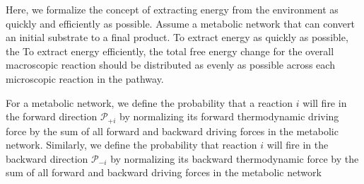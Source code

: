 Here, we formalize the concept of extracting energy from the environment as quickly and efficiently as possible. Assume a metabolic network that can convert an initial substrate to a final product. To extract energy as quickly as possible, the   To extract energy efficiently, the total free energy change for the overall macroscopic reaction should be distributed as evenly as possible across each microscopic reaction in the pathway.


For a metabolic network, we define the probability that a reaction $i$ will fire in the forward  direction ${\mathcal P_{+i}}$ by normalizing its forward thermodynamic driving force by the sum of all forward and backward driving forces in the metabolic network. Similarly, we define the probability that reaction $i$ will fire in the backward direction $\mathcal P_{-i}$ by normalizing its backward thermodynamic force by  the sum of all forward and backward driving forces in the metabolic network